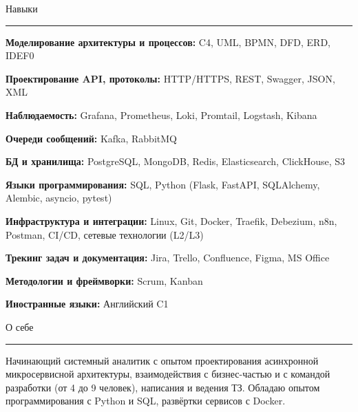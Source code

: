 \documentclass[14pt, a4paper, oneside]{extarticle}
\begin{document}
\begin{flushleft}
	\vspace{-\intextsep}
	\large Навыки
\end{flushleft}

\vspace{-0.8\intextsep}
\hrule


\vspace{0.5\intextsep}

\textbf{Моделирование архитектуры и процессов:} C4, UML, BPMN, DFD, ERD, IDEF0

\textbf{Проектирование API, протоколы:} HTTP/HTTPS, REST, Swagger, JSON, XML

\textbf{Наблюдаемость:} Grafana, Prometheus, Loki, Promtail, Logstash, Kibana

\textbf{Очереди сообщений:} Kafka, RabbitMQ

\textbf{БД и хранилища:} PostgreSQL, MongoDB, Redis, Elasticsearch, ClickHouse, S3

\textbf{Языки программирования:} SQL, Python (Flask, FastAPI, SQLAlchemy, Alembic, asyncio, pytest)

\textbf{Инфраструктура и интеграции:} Linux, Git, Docker, Traefik, Debezium, n8n, Postman, CI/CD, сетевые технологии (L2/L3)

\textbf{Трекинг задач и документация:} Jira, Trello, Confluence, Figma, MS Office

\textbf{Методологии и фреймворки:} Scrum, Kanban

\textbf{Иностранные языки:} Английский C1


\begin{flushleft}
	\vspace{-\intextsep}
	\large О себе
\end{flushleft}

\vspace{-0.8\intextsep}
\hrule

\begin{sloppypar}
	\vspace{0.5\intextsep}
	\quad
	Начинающий системный аналитик с опытом проектирования асинхронной микросервисной архитектуры, взаимодействия с бизнес-частью и с командой разработки (от 4 до 9 человек), написания и ведения ТЗ. Обладаю опытом программирования с Python и SQL, развёртки сервисов с Docker. 
\end{sloppypar}
\end{document}
